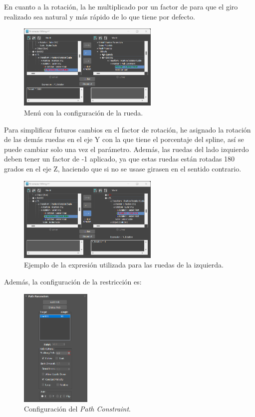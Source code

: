 \bigskip

En cuanto a la rotación, la he multiplicado por un factor de \rotFactor para que el giro realizado sea natural y más rápido de lo que tiene por defecto.

\begin{figure}[H]
    \centering
   \includegraphics[width=0.6\textwidth]{imagenes/coche/wireFR.png}
   \caption{Menú con la configuración de la rueda.}
\end{figure}

Para simplificar futuros cambios en el factor de rotación, he asignado la rotación de las demás ruedas en el eje Y con la que tiene el porcentaje del spline, así se puede cambiar solo una vez el parámetro. Además, las ruedas del lado izquierdo deben tener un factor de -1 aplicado, ya que estas ruedas están rotadas 180 grados en el eje Z, haciendo que si no se usase girasen en el sentido contrario.

\begin{figure}[H]
    \centering
   \includegraphics[width=0.6\textwidth]{imagenes/coche/wireFL.png}
   \caption{Ejemplo de la expresión utilizada para las ruedas de la izquierda.}
\end{figure}


Además, la configuración de la restricción es: 

\begin{figure}[H]
    \centering
   \includegraphics[width=0.3\textwidth]{imagenes/coche/config.png}
   \caption{Configuración del \textit{Path Constraint}.}
\end{figure}

